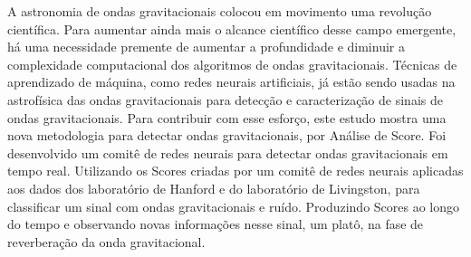 A astronomia de ondas gravitacionais colocou em movimento uma revolução científica. Para aumentar ainda mais o alcance científico desse campo emergente, há uma necessidade premente de aumentar a profundidade e diminuir a complexidade computacional dos algoritmos de ondas gravitacionais. Técnicas de aprendizado de máquina, como redes neurais artificiais, já estão sendo usadas na astrofísica das ondas gravitacionais para detecção e caracterização de sinais de ondas gravitacionais. Para contribuir com esse esforço, este estudo mostra uma nova metodologia para detectar ondas gravitacionais, por Análise de Score. Foi desenvolvido um comitê de redes neurais para detectar ondas gravitacionais em tempo real. Utilizando os Scores criadas por um comitê de redes neurais aplicadas aos dados dos laboratório de Hanford e do laboratório de Livingston, para classificar um sinal com ondas gravitacionais e ruído. Produzindo Scores ao longo do tempo e observando novas informações nesse sinal, um platô, na fase de reverberação da onda gravitacional.



